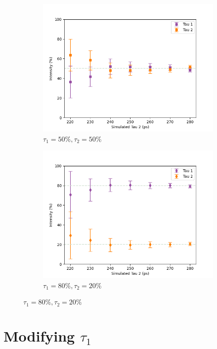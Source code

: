 \begin{figure}[p]
{\begin{subfigure}{.7\textwidth}
        \includegraphics[width=0.95\linewidth]{Batch 1+2/5050.png}
        \caption{$\tau_1 = 50\%, \tau_2 = 50\%$}
        \label{fig:180-5050}
    \end{subfigure}
    \begin{subfigure}{.7\textwidth}
        \centering
        \includegraphics[width=0.95\linewidth]{Batch 1+2/8020.png}
        \caption{$\tau_1 = 80\%, \tau_2 = 20\%$}
        \label{fig:180-8020}
    \end{subfigure}
    }
\end{figure}

\pagebreak

\section{Modifying $\tau_1$}

